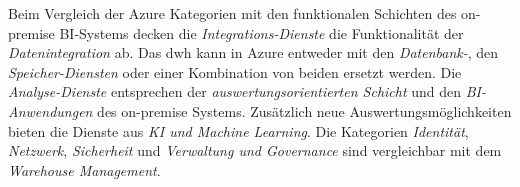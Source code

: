 Beim Vergleich der Azure Kategorien mit den funktionalen Schichten des on-premise BI-Systems decken die \textit{Integrations-Dienste} die  Funktionalität der \textit{Datenintegration} ab. Das \ac{dwh} kann in Azure entweder mit den \textit{Datenbank-}, den \textit{Speicher-Diensten} oder einer Kombination von beiden ersetzt werden. Die \textit{Analyse-Dienste} entsprechen der \textit{auswertungsorientierten Schicht} und den \textit{BI-Anwendungen} des on-premise Systems. Zusätzlich neue Auswertungsmöglichkeiten bieten die Dienste aus \textit{KI und Machine Learning}. Die Kategorien \textit{Identität}, \textit{Netzwerk}, \textit{Sicherheit} und \textit{Verwaltung und Governance} sind vergleichbar mit dem \textit{Warehouse Management}.
